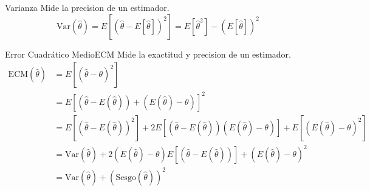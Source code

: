 \documentclass[a4paper,11pt]{article}
\begin{document}
\begin{definicion}{Varianza}{}
    Mide la precision de un estimador.
    \begin{equation*}
        \text{Var}(\hat{\theta}) = E[(\hat{\theta} - E[\hat{\theta}])^2] = E[\hat{\theta}^2] - (E[\hat{\theta}])^2
    \end{equation*}
\end{definicion}

\begin{definicion}{Error Cuadrático Medio}{ECM}
    Mide la exactitud y precision de un estimador.
    \begin{equation*}
        \begin{array}{ll}
            \text{ECM}(\hat{\theta})  & = E[(\hat{\theta} - \theta)^2] \\
            & = E[(\hat{\theta} - E(\hat{\theta})) + (E(\hat{\theta}) - \theta)]^2 \\
            & = E[(\hat{\theta} - E(\hat{\theta}))^2] + 2E[(\hat{\theta} - E(\hat{\theta}))(E(\hat{\theta}) - \theta)] + E[(E(\hat{\theta}) - \theta)^2] \\
            & = \text{Var}(\hat{\theta}) + 2(E(\hat{\theta}) - \theta)E[(\hat{\theta} - E(\hat{\theta}))] + (E(\hat{\theta}) - \theta)^2 \\
            & = \text{Var}(\hat{\theta}) + (\text{Sesgo}(\hat{\theta}))^2
        \end{array}
    \end{equation*}
\end{definicion}       
    
    
    
\end{document}
